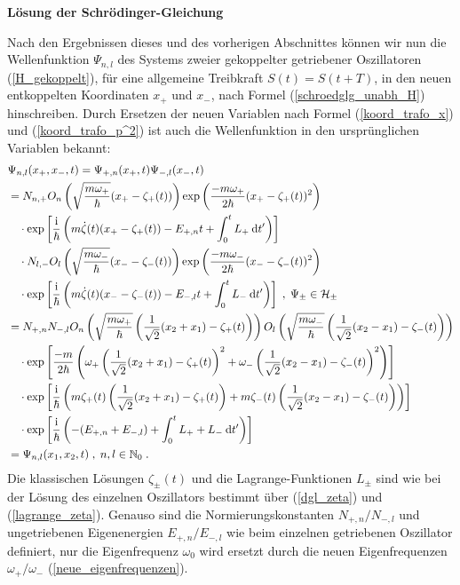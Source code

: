   \textbf{Lösung der Schrödinger-Gleichung}

  Nach den Ergebnissen dieses und des vorherigen Abschnittes können wir nun die Wellenfunktion $\Psi_{n,l}$ des Systems zweier gekoppelter getriebener Oszillatoren (\ref{H_gekoppelt}), für eine allgemeine Treibkraft $S(t)=S(t+T)$, in den neuen entkoppelten Koordinaten $x_+$ und $x_-$, nach Formel (\ref{schroedglg_unabh_H}) hinschreiben.
  Durch Ersetzen der neuen Variablen nach Formel (\ref{koord_trafo_x}) und (\ref{koord_trafo_p^2}) ist auch die Wellenfunktion in den ursprünglichen Variablen bekannt:
  \begin{align}
     &\Psi_{n,l}(x_+,x_-,t) = \Psi_{+,n}(x_+,t)\Psi_{-,l}(x_-,t) \notag\\
     &=N_{n,+}O_n\left(\sqrt{\frac{m\omega_+}{\hbar}}(x_+-\zeta_+(t))\right) \exp\left(\frac{-m\omega_+}{2\hbar}(x_+-\zeta_+(t))^2\right)\notag\\
     &\quad \cdot \exp\left[\frac{\text i}{\hbar}\left(m\dot \zeta(t)(x_+-\zeta_+(t))-E_{+,n}t+\int_0^tL_+\:\text dt'\right)\right] \quad\quad\quad\notag\\
     &\quad \cdot N_{l,-}O_l\left(\sqrt{\frac{m\omega_-}{\hbar}}(x_--\zeta_-(t))\right) \exp\left(\frac{-m\omega_-}{2\hbar}(x_--\zeta_-(t))^2\right)\notag\\
     &\quad \cdot \exp\left[\frac{\text i}{\hbar}\left(m\dot \zeta(t)(x_--\zeta_-(t))-E_{-,l}t+\int_0^tL_-\:\text dt'\right)\right] \;,\; \Psi_\pm \in \cal H_\pm \notag\\
    &= N_{+,n}N_{-,l} O_n\left(\sqrt{\frac{m\omega_+}{\hbar}}\left(\frac{1}{\sqrt{2}}(x_2+x_1)-\zeta_+(t)\right)\right)O_l\left(\sqrt{\frac{m\omega_-}{\hbar}}\left(\frac{1}{\sqrt{2}}(x_2-x_1)-\zeta_-(t)\right)\right) \notag\\
    &\quad\cdot \exp\left[\frac{-m}{2\hbar}\left(\omega_+\left(\frac{1}{\sqrt{2}}(x_2+x_1)-\zeta_+(t)\right)^2 + \omega_-\left(\frac{1}{\sqrt{2}}(x_2-x_1)-\zeta_-(t)\right)^2\right)\right] \notag\\
    &\quad\cdot \exp\left[\frac{\text i}{\hbar} \left(m\zeta_+(t)\left(\frac{1}{\sqrt{2}}(x_2+x_1)-\zeta_+(t)\right) + m\zeta_-(t)\left(\frac{1}{\sqrt{2}}(x_2-x_1)-\zeta_-(t)\right)\right) \right] \notag\\
    &\quad\cdot \exp \left[\frac{\text i}{\hbar}\left(-(E_{+,n}+E_{-,l})+\int_0^tL_++L_-\:\text dt'\right)\right] \notag\\
    &=\Psi_{n,l}(x_1,x_2,t) \; , \; n,l \in \mathbb N_0 \; .
  \end{align}
  Die klassischen Lösungen $\zeta_\pm(t)$ und die Lagrange-Funktionen $L_\pm$ sind wie bei der Lösung des einzelnen Oszillators bestimmt über (\ref{dgl_zeta}) und (\ref{lagrange_zeta}).
  Genauso sind die Normierungskonstanten $N_{+,n}/N_{-,l}$ und ungetriebenen Eigenenergien $E_{+,n}/E_{-,l}$ wie beim einzelnen getriebenen Oszillator definiert, nur die Eigenfrequenz $\omega_0$ wird ersetzt durch die neuen Eigenfrequenzen $\omega_+/\omega_-$ (\ref{neue_eigenfrequenzen}).

